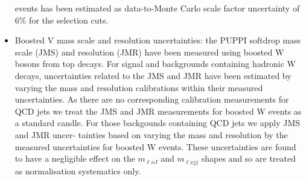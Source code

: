 \begin{itemize}
events has been estimated  as data-to-Monte Carlo scale factor uncertainty of 6\% for the selection cuts. 
\item Boosted V mass scale and resolution uncertainties: the PUPPI softdrop mass scale (JMS)  and resolution (JMR) have been measured using boosted
W bosons from top decays. For signal and backgrounds containing hadronic W decays, uncertainties 
related to the JMS and JMR have been estimated by varying the mass and resolution
calibrations within their measured uncertainties.
As there are no corresponding calibration
measurements for QCD jets we treat the JMS and JMR measurements for boosted W events as
a standard candle. For those backgounds containing QCD jets we apply JMS and JMR uncer-
tainties based on varying the mass and resolution by the measured uncertainties for boosted
W events. These uncertainties are found to have a negligible effect on the $m_{\ell \nu J}$ and $m_{\ell \nu jj}$ shapes
and so are treated as normalisation systematics only.
\end{itemize}
